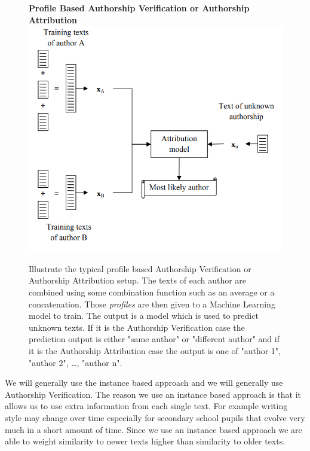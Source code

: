 \begin{figure}[htb]
    \centering
    \textbf{Profile Based Authorship Verification or Authorship Attribution}
    \includegraphics[scale=0.4]{./pictures/method/profile_based.png}
    \caption{Illustrate the typical profile based Authorship Verification or
        Authorship Attribution setup.\cite{stamatos2009} The texts of each
        author are combined using some combination function such as an average
        or a concatenation. Those \textit{profiles} are then given to a Machine
        Learning model to train. The output is a model which is used to predict
        unknown texts. If it is the Authorship Verification case the prediction
        output is either "same author" or "different author" and if it is the
        Authorship Attribution case the output is one of "author 1", "author 2",
        \dots, "author n".}
    \label{fig:profile_based}
\end{figure}

We will generally use the instance based approach and we will generally use
Authorship Verification. The reason we use an instance based approach is that it
allows us to use extra information from each single text. For example writing
style may change over time especially for secondary school pupils that evolve
very much in a short amount of time. Since we use an instance based approach we
are able to weight similarity to newer texts higher than similarity to older
texts.

